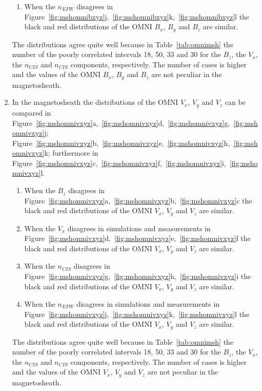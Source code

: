 \documentclass[linenumbers,draft]{agujournal}
\begin{document}
\begin{enumerate}
\begin{enumerate}
\item When the $n_{EFW}$ disagrees in Figure~\ref{fig:mshomnibxyz}j,~\ref{fig:mshomnibxyz}k,~\ref{fig:mshomnibxyz}l the black and red distributions of the OMNI $B_{x}$, $B_{y}$ and $B_{z}$ are similar.
\end{enumerate}
The distributions agree quite well because in Table~\ref{tab:omnimsh} the number of the poorly correlated intervals 18, 50, 33 and 30 for the $B_{z}$, the $V_{x}$, the $n_{CIS}$ and $n_{CIS}$ components, respectively. The number of cases is higher and the values of the OMNI $B_{x}$, $B_{y}$ and $B_{z}$ are not peculiar in the magnetosheath.

\item In the magnetosheath the distributions of the OMNI $V_{x}$, $V_{y}$ and $V_{z}$ can be compared in Figure~{\ref{fig:mshomnivxyz}a,~\ref{fig:mshomnivxyz}d,~\ref{fig:mshomnivxyz}g,~\ref{fig:mshomnivxyz}j; Figure~\ref{fig:mshomnivxyz}b,~\ref{fig:mshomnivxyz}e,~\ref{fig:mshomnivxyz}h,~\ref{fig:mshomnivxyz}k; furthermore in Figure~\ref{fig:mshomnivxyz}c,~\ref{fig:mshomnivxyz}f,~\ref{fig:mshomnivxyz}i,~\ref{fig:mshomnivxyz}l.}
\begin{enumerate}
\item When the $B_{z}$ disagrees in Figure~\ref{fig:mshomnivxyz}a,~\ref{fig:mshomnivxyz}b,~\ref{fig:mshomnivxyz}c the black and red distributions of the OMNI $V_{x}$, $V_{y}$ and $V_{z}$ are similar.

\item When the $V_{x}$ disagrees in simulations and measurements in Figure~\ref{fig:mshomnivxyz}d,~\ref{fig:mshomnivxyz}e,~\ref{fig:mshomnivxyz}f the black and red distributions of the OMNI $V_{x}$, $V_{y}$ and $V_{z}$ are similar.

\item When the $n_{CIS}$ disagrees in Figure~\ref{fig:mshomnivxyz}g,~\ref{fig:mshomnivxyz}h,~\ref{fig:mshomnivxyz}i the black and red distributions of the OMNI $V_{x}$, $V_{y}$ and $V_{z}$ are similar.

\item When the $n_{EFW}$ disagrees in simulations and measurements in Figure~\ref{fig:mshomnivxyz}j,~\ref{fig:mshomnivxyz}k,~\ref{fig:mshomnivxyz}l the black and red distributions of the OMNI $V_{x}$, $V_{y}$ and $V_{z}$ are similar.
\end{enumerate}
The distributions agree quite well because in Table~\ref{tab:omnimsh} the number of the poorly correlated intervals 18, 50, 33 and 30 for the $B_{z}$, the $V_{x}$, the $n_{CIS}$ and $n_{CIS}$ components, respectively. The number of cases is higher and the values of the OMNI $V_{x}$, $V_{y}$ and $V_{z}$ are not peculiar in the magnetosheath.


\end{enumerate}
\end{document}
